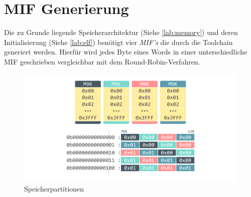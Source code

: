     \section{MIF Generierung}

        Die zu Grunde liegende Speicherarchitektur (Siehe \ref{lab:memory})
        und deren Initialisierung (Siehe \ref{lab:elf}) benötigt vier \textit{MIF's}
        die durch die Toolchain generiert werden. Hierfür wird jedes Byte eines Words
        in einer unterschiedliche MIF geschrieben vergleichbar mit dem Round-Robin-Verfahren.

        \begin{figure}[H]
            \centering
            \includegraphics[scale=1]{img/memorypartition.pdf}
            \caption{Speicherpartitionen}
            \label{fig:memorypartition}
        \end{figure}
        
        
        
       